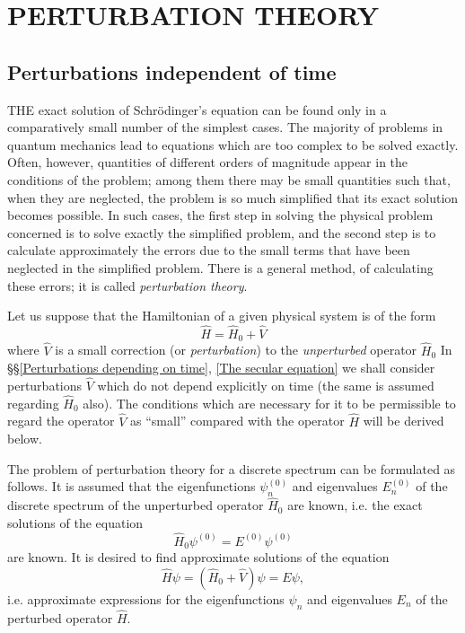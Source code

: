 \chapter{PERTURBATION THEORY}\label{PERTURBATION THEORY}
\section{Perturbations independent of time}\label{Perturbations independent of time}
THE exact solution of Schr\"odinger’s equation can be found only in a comparatively small number of the simplest cases. The majority of problems in quantum mechanics lead to equations which are too complex to be solved exactly. Often, however, quantities of different orders of magnitude appear in the conditions of the problem; among them there may be small quantities such that, when they are neglected, the problem is so much simplified that its exact solution becomes possible. In such cases, the first step in solving the physical problem concerned is to solve exactly the simplified problem, and the second step is to calculate approximately the errors due to the small terms that have been neglected in the simplified problem. There is a general method, of calculating these errors; it is called \textit{perturbation theory}.

Let us suppose that the Hamiltonian of a given physical system is of the form
\[ \hat{H}=\hat{H}_0+\hat{V} \]
where $\hat{V}$ is a small correction (or \textit{perturbation}) to the \textit{unperturbed} operator $\hat{H}_0$ In \S\S\ref{Perturbations depending on time}, \ref{The secular equation} we shall consider perturbations $\hat{V}$ which do not depend explicitly on time (the same is assumed regarding $\hat{H}_0$ also). The conditions which are necessary for it to be permissible to regard the operator $\hat{V}$ as “small” compared with the operator $\hat{H}$ will be derived below.

The problem of perturbation theory for a discrete spectrum can be formulated as follows. It is assumed that the eigenfunctions $\psi_n^{(0)}$ and eigenvalues $ E_n^{(0)} $ of the discrete spectrum of the unperturbed operator $\hat{H}_0$ are known, i.e. the exact solutions of the equation
\begin{equation}\label{38.1}
\hat{H}_0\psi^{(0)}=E^{(0)}\psi^{(0)}
\end{equation}
are known. It is desired to find approximate solutions of the equation
\begin{equation}\label{38.2}
\hat{H}\psi=(\hat{H}_0+\hat{V})\psi=E\psi,
\end{equation}
i.e. approximate expressions for the eigenfunctions $\psi_n$ and eigenvalues $ E_n $ of the perturbed operator $\hat{H}$.

